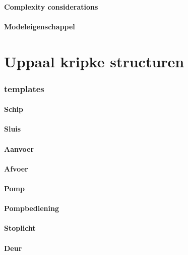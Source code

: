 \paragraph{Complexity considerations}


\paragraph{Modeleigenschappel}


\section{Uppaal kripke structuren}


\subsubsection{templates}

\paragraph{Schip}

\paragraph{Sluis}


\paragraph{Aanvoer}


\paragraph{Afvoer}

\paragraph{Pomp}

\paragraph{Pompbediening}


\paragraph{Stoplicht}

\paragraph{Deur}







